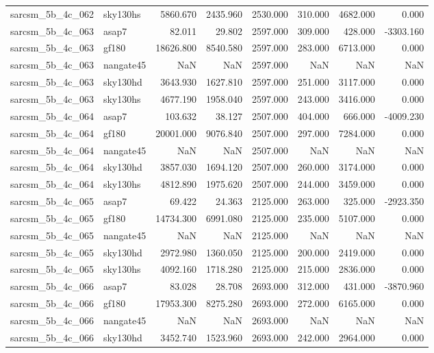 \begin{tabular}{llrrrrrr}
sarcsm\_5b\_4c\_062 & sky130hs & 5860.670 & 2435.960 & 2530.000 & 310.000 & 4682.000 & 0.000 \\
sarcsm\_5b\_4c\_063 & asap7 & 82.011 & 29.802 & 2597.000 & 309.000 & 428.000 & -3303.160 \\
sarcsm\_5b\_4c\_063 & gf180 & 18626.800 & 8540.580 & 2597.000 & 283.000 & 6713.000 & 0.000 \\
sarcsm\_5b\_4c\_063 & nangate45 & NaN & NaN & 2597.000 & NaN & NaN & NaN \\
sarcsm\_5b\_4c\_063 & sky130hd & 3643.930 & 1627.810 & 2597.000 & 251.000 & 3117.000 & 0.000 \\
sarcsm\_5b\_4c\_063 & sky130hs & 4677.190 & 1958.040 & 2597.000 & 243.000 & 3416.000 & 0.000 \\
sarcsm\_5b\_4c\_064 & asap7 & 103.632 & 38.127 & 2507.000 & 404.000 & 666.000 & -4009.230 \\
sarcsm\_5b\_4c\_064 & gf180 & 20001.000 & 9076.840 & 2507.000 & 297.000 & 7284.000 & 0.000 \\
sarcsm\_5b\_4c\_064 & nangate45 & NaN & NaN & 2507.000 & NaN & NaN & NaN \\
sarcsm\_5b\_4c\_064 & sky130hd & 3857.030 & 1694.120 & 2507.000 & 260.000 & 3174.000 & 0.000 \\
sarcsm\_5b\_4c\_064 & sky130hs & 4812.890 & 1975.620 & 2507.000 & 244.000 & 3459.000 & 0.000 \\
sarcsm\_5b\_4c\_065 & asap7 & 69.422 & 24.363 & 2125.000 & 263.000 & 325.000 & -2923.350 \\
sarcsm\_5b\_4c\_065 & gf180 & 14734.300 & 6991.080 & 2125.000 & 235.000 & 5107.000 & 0.000 \\
sarcsm\_5b\_4c\_065 & nangate45 & NaN & NaN & 2125.000 & NaN & NaN & NaN \\
sarcsm\_5b\_4c\_065 & sky130hd & 2972.980 & 1360.050 & 2125.000 & 200.000 & 2419.000 & 0.000 \\
sarcsm\_5b\_4c\_065 & sky130hs & 4092.160 & 1718.280 & 2125.000 & 215.000 & 2836.000 & 0.000 \\
sarcsm\_5b\_4c\_066 & asap7 & 83.028 & 28.708 & 2693.000 & 312.000 & 431.000 & -3870.960 \\
sarcsm\_5b\_4c\_066 & gf180 & 17953.300 & 8275.280 & 2693.000 & 272.000 & 6165.000 & 0.000 \\
sarcsm\_5b\_4c\_066 & nangate45 & NaN & NaN & 2693.000 & NaN & NaN & NaN \\
sarcsm\_5b\_4c\_066 & sky130hd & 3452.740 & 1523.960 & 2693.000 & 242.000 & 2964.000 & 0.000 \\

\end{tabular}
